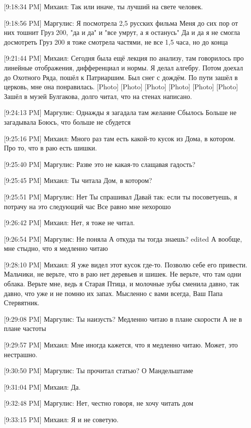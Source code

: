 \documentclass{article}
\begin{document}
[9:18:34 PM] Михаил:
Так или иначе, ты лучший на свете человек.

[9:18:56 PM] Маргулис:
Я посмотрела 2,5 русских фильма
 Меня до сих пор от них тошнит
 Груз 200, "да и да" и "все умрут, а я останусь"
 Да и да я не смогла досмотреть
 Груз 200 я тоже смотрела частями, не все 1,5 часа, но до конца

[9:21:44 PM] Михаил:
Сегодня была ещё лекция по анализу, там говорилось про линейные отображения, дифференциал и нормы. Я делал алгебру. Потом доехал до Охотного Ряда, пошёл к Патриаршим. Был снег с дождём. По пути зашёл в церковь, мне она понравилась.
 [Photo]
 [Photo]
 [Photo]
 [Photo]
 [Photo]
 [Photo]
 Зашёл в музей Булгакова, долго читал, что на стенах написано.

[9:24:13 PM] Маргулис:
Однажды я загадала там желание
 Сбылось
 Больше не загадывала
 Боюсь, что больше не сбудется

[9:25:16 PM] Михаил:
Много раз там есть какой-то кусок из Дома, в котором. Про то, что в раю есть шишки.

[9:25:40 PM] Маргулис:
Разве это не какая-то слащавая гадость?

[9:25:45 PM] Михаил:
Ты читала Дом, в котором?

[9:25:51 PM] Маргулис:
Нет
 Ты спрашивал
 Давай так: если ты посоветуешь, я потрачу на это следующий час
 Все равно мне нехорошо

[9:26:42 PM] Михаил:
Нет, я тоже не читал.

[9:26:54 PM] Маргулис:
Не поняла
 А откуда ты тогда знаешь?
edited 
А вообще, мне стыдно, что я медленно читаю

[9:28:10 PM] Михаил:
Я уже видел этот кусок где-то. Позволю себе его привести.
Мальчики, не верьте, что в раю нет деревьев и шишек. Не верьте, что там одни облака. Верьте мне, ведь я Старая Птица, и молочные зубы сменила давно, так давно, что уже и не помню их запах. 
Мысленно с вами всегда, Ваш Папа Стервятник.

[9:29:08 PM] Маргулис:
Ты наизусть?
 Медленно читаю в плане скорости
 А не в плане частоты

[9:29:57 PM] Михаил:
Мне иногда кажется, что я медленно читаю.
 Может, это нестрашно.

[9:30:50 PM] Маргулис:
Ты прочитал статью?
 О Мандельштаме

[9:31:04 PM] Михаил:
Да.

[9:32:48 PM] Маргулис:
Нет, честно говоря, не хочу читать дом

[9:33:15 PM] Михаил:
Я и не советую.
\end{document}
